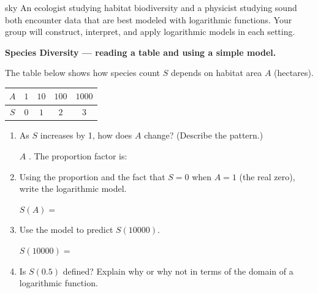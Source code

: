 \documentclass[10pt]{article}
\begin{document}
\namepartnerperiod

\vspace{0.1in}

\begin{scenariobox}{sky}
An ecologist studying habitat biodiversity and a physicist studying sound both encounter
data that are best modeled with logarithmic functions. Your group will construct, interpret,
and apply logarithmic models in each setting.
\end{scenariobox}

\vspace{0.1in}

\begin{tcolorbox}[colback=white, colframe=black!40,
    title=\textbf{Tier R --- Remediate},
    fonttitle=\bfseries, arc=2mm, left=3mm, right=3mm, top=2mm, bottom=2mm]

\textbf{Species Diversity --- reading a table and using a simple model.}

\vspace{4pt}
The table below shows how species count $S$ depends on habitat area $A$ (hectares).

\vspace{4pt}
\begin{center}
\renewcommand{\arraystretch}{1.8}
\begin{tabular}{|c|c|c|c|c|}
\hline
\rowcolor{sky}
$A$ & $1$ & $10$ & $100$ & $1000$ \\
\hline
$S$ & $0$ & $1$  & $2$   & $3$ \\
\hline
\end{tabular}
\end{center}

\begin{enumerate}[leftmargin=1.8em, itemsep=10pt]

\item As $S$ increases by 1, how does $A$ change? (Describe the pattern.)

\vspace{4pt}
$A$ \blank{5cm}. The proportion factor is: \blank{1.5cm}

\item Using the proportion and the fact that $S = 0$ when $A = 1$ (the real zero), write
      the logarithmic model.

\vspace{4pt}
$S(A) = $ \blank{4cm}

\item Use the model to predict $S(10000)$.

\vspace{4pt}
$S(10000) = $ \blank{5cm}

\item Is $S(0.5)$ defined? Explain why or why not in terms of the domain of a
      logarithmic function.


\end{enumerate}
\end{tcolorbox}
\end{document}

